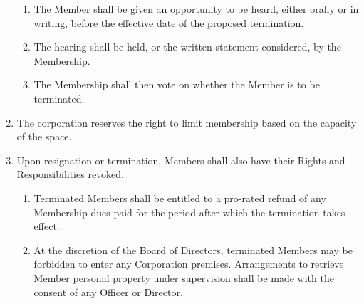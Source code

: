\documentclass{article}
\begin{document}
\begin{enumerate}
\begin{enumerate}
		\item The Member shall be given an opportunity to be heard, either orally or in writing, before the effective date of the proposed termination.
		\item The hearing shall be held, or the written statement considered, by the Membership.
		\item The Membership shall then vote on whether the Member is to be terminated.
	\end{enumerate}
	\item The corporation reserves the right to limit membership based on the capacity of the space.
	\item Upon resignation or termination, Members shall also have their Rights and Responsibilities revoked.
	\begin{enumerate}
		\item Terminated Members shall be entitled to a pro-rated refund of any Membership dues paid for the period after which the termination takes effect.
		\item At the discretion of the Board of Directors, terminated Members may be forbidden to enter any Corporation premises.  Arrangements to retrieve Member personal property under supervision shall be made with the consent of any Officer or Director.
	\end{enumerate}
\end{enumerate}
\end{document}
